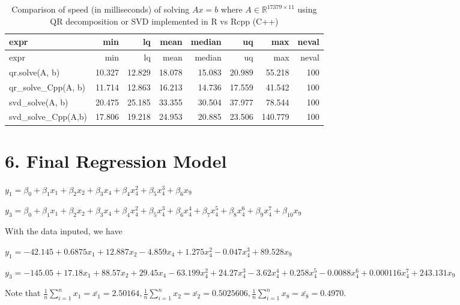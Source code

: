 \documentclass[
]{article}
\begin{document}
\begin{longtable}[]{@{}lrrrrrrr@{}}
\caption{Comparison of speed (in milliseconds) of solving \(Ax = b\)
where \(A \in \mathbb{R}^{17379 \times 11}\) using QR decomposition or
SVD implemented in R vs Rcpp (C++)}\tabularnewline
\toprule
expr & min & lq & mean & median & uq & max & neval\tabularnewline
\midrule
\endfirsthead
\toprule
expr & min & lq & mean & median & uq & max & neval\tabularnewline
\midrule
\endhead
qr.solve(A, b) & 10.327 & 12.829 & 18.078 & 15.083 & 20.989 & 55.218 &
100\tabularnewline
qr\_solve\_Cpp(A, b) & 11.714 & 12.863 & 16.213 & 14.736 & 17.559 &
41.542 & 100\tabularnewline
svd\_solve(A, b) & 20.475 & 25.185 & 33.355 & 30.504 & 37.977 & 78.544 &
100\tabularnewline
svd\_solve\_Cpp(A,b) & 17.806 & 19.218 & 24.953 & 20.885 & 23.506 &
140.779 & 100\tabularnewline
\bottomrule
\end{longtable}

\hypertarget{final-regression-model}{%
\section{6. Final Regression Model}\label{final-regression-model}}

\(y_{1} = \beta_{0} + \beta_{1}x_{1} + \beta_{2}x_{2} + \beta_{3}x_{4} + \beta_{4}x_{4}^{2} + \beta_{5}x_{4}^{3} + \beta_{6}x_{9}\)

\(y_{3} = \beta_{0} + \beta_{1}x_{1} + \beta_{2}x_{2} + \beta_{3}x_{4} + \beta_{4}x_{4}^{2} + \beta_{5}x_{4}^{3} + \beta_{6}x_{4}^{4} + \beta_{7}x_{4}^{5} + \beta_{8}x_{4}^{6} + \beta_{9}x_{4}^{7} + \beta_{10}x_{9}\)

With the data inputed, we have

\(y_{1} = -42.145 + 0.6875x_{1} + 12.887x_{2} - 4.859x_{4} + 1.275x_{4}^{2} - 0.047x_{4}^{3} + 89.528x_{9}\)

\(y_{3} = -145.05 + 17.18x_{1} + 88.57x_{2} + 29.45x_{4} - 63.199x_{4}^{2} + 24.27x_{4}^{3} - 3.62x_{4}^{4} + 0.258x_{4}^{5} - 0.0088x_{4}^{6} + 0.000116x_{4}^{7} + 243.131x_{9}\)

Note that
\(\frac{1}{n}\sum_{i=1}^{n} x_{1} = \bar{x_{1}} = 2.50164, \frac{1}{n}\sum_{i=1}^{n} x_{2} = \bar{x_{2}} = 0.5025606, \frac{1}{n}\sum_{i=1}^{n} x_{8} = \bar{x_{8}} = 0.4970\).
\end{document}
